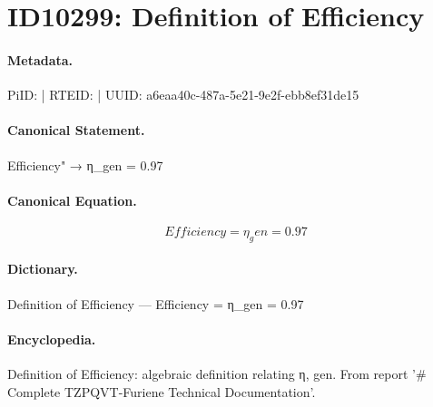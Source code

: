 \section*{ID10299: Definition of Efficiency}
\paragraph{Metadata.}
PiID:  | RTEID:  | UUID: a6eaa40c-487a-5e21-9e2f-ebb8ef31de15

\paragraph{Canonical Statement.}
Efficiency" → η\_gen = 0.97

\paragraph{Canonical Equation.}
\[
Efficiency = η_gen = 0.97
\]

\paragraph{Dictionary.}
Definition of Efficiency — Efficiency = η\_gen = 0.97

\paragraph{Encyclopedia.}
Definition of Efficiency: algebraic definition relating η, gen. From report '\# Complete TZPQVT-Furiene Technical Documentation'.
